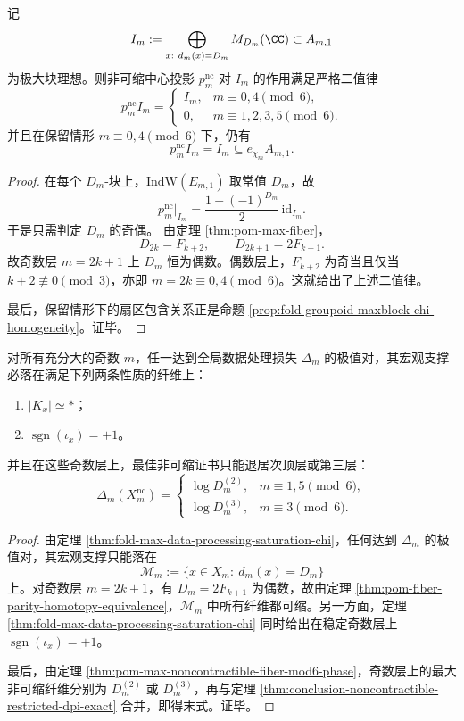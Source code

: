 \begin{theorem}[极大块理想在非可缩筛子下的二值律]\label{thm:conclusion-noncontractible-maxideal-binary-law}
记
\[
I_m:=\bigoplus_{x:\ d_m(x)=D_m}M_{D_m}(\CC)\subset A_{m,1}
\]
为极大块理想。则非可缩中心投影 \(p_m^{\mathrm{nc}}\) 对 \(I_m\) 的作用满足严格二值律
\[
p_m^{\mathrm{nc}}I_m=
\begin{cases}
I_m,& m\equiv 0,4\pmod 6,\\
0,& m\equiv 1,2,3,5\pmod 6.
\end{cases}
\]
并且在保留情形 \(m\equiv 0,4\pmod 6\) 下，仍有
\[
p_m^{\mathrm{nc}}I_m=I_m\subseteq e_{\chi_m}A_{m,1}.
\]
\end{theorem}
\begin{proof}
在每个 \(D_m\)-块上，\(\mathrm{IndW}(E_{m,1})\) 取常值 \(D_m\)，故
\[
p_m^{\mathrm{nc}}\big|_{I_m}
=
\frac{1-(-1)^{D_m}}{2}\,\mathrm{id}_{I_m}.
\]
于是只需判定 \(D_m\) 的奇偶。
由定理 \ref{thm:pom-max-fiber}，
\[
D_{2k}=F_{k+2},\qquad D_{2k+1}=2F_{k+1}.
\]
故奇数层 \(m=2k+1\) 上 \(D_m\) 恒为偶数。偶数层上，\(F_{k+2}\) 为奇当且仅当 \(k+2\not\equiv 0\pmod 3\)，亦即 \(m=2k\equiv 0,4\pmod 6\)。这就给出了上述二值律。

最后，保留情形下的扇区包含关系正是命题 \ref{prop:fold-groupoid-maxblock-chi-homogeneity}。证毕。
\end{proof}

\begin{corollary}[奇数层的绝对极值证书必然同伦平凡]\label{cor:conclusion-noncontractible-odd-global-extremizers-contractible}
对所有充分大的奇数 \(m\)，任一达到全局数据处理损失 \(\Delta_m\) 的极值对，其宏观支撑必落在满足下列两条性质的纤维上：
\begin{enumerate}
  \item \(|K_x|\simeq *\)；
  \item \(\operatorname{sgn}(\iota_x)=+1\)。
\end{enumerate}
并且在这些奇数层上，最佳非可缩证书只能退居次顶层或第三层：
\[
\Delta_m(X_m^{\mathrm{nc}})
=
\begin{cases}
\log D_m^{(2)},& m\equiv 1,5\pmod 6,\\
\log D_m^{(3)},& m\equiv 3\pmod 6.
\end{cases}
\]
\end{corollary}
\begin{proof}
由定理 \ref{thm:fold-max-data-processing-saturation-chi}，任何达到 \(\Delta_m\) 的极值对，其宏观支撑只能落在
\[
\mathcal M_m:=\{x\in X_m:\ d_m(x)=D_m\}
\]
上。对奇数层 \(m=2k+1\)，有 \(D_m=2F_{k+1}\) 为偶数，故由定理 \ref{thm:pom-fiber-parity-homotopy-equivalence}，\(\mathcal M_m\) 中所有纤维都可缩。另一方面，定理 \ref{thm:fold-max-data-processing-saturation-chi} 同时给出在稳定奇数层上 \(\operatorname{sgn}(\iota_x)=+1\)。

最后，由定理 \ref{thm:pom-max-noncontractible-fiber-mod6-phase}，奇数层上的最大非可缩纤维分别为 \(D_m^{(2)}\) 或 \(D_m^{(3)}\)，再与定理 \ref{thm:conclusion-noncontractible-restricted-dpi-exact} 合并，即得末式。证毕。
\end{proof}

